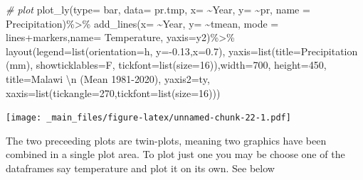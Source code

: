 \documentclass[
]{book}
\newenvironment{Shaded}{\begin{snugshade}}{\end{snugshade}}
\newcommand{\AttributeTok}[1]{\textcolor[rgb]{0.77,0.63,0.00}{#1}}
\newcommand{\CommentTok}[1]{\textcolor[rgb]{0.56,0.35,0.01}{\textit{#1}}}
\newcommand{\DecValTok}[1]{\textcolor[rgb]{0.00,0.00,0.81}{#1}}
\newcommand{\FloatTok}[1]{\textcolor[rgb]{0.00,0.00,0.81}{#1}}
\newcommand{\FunctionTok}[1]{\textcolor[rgb]{0.00,0.00,0.00}{#1}}
\newcommand{\NormalTok}[1]{#1}
\newcommand{\SpecialCharTok}[1]{\textcolor[rgb]{0.00,0.00,0.00}{#1}}
\newcommand{\StringTok}[1]{\textcolor[rgb]{0.31,0.60,0.02}{#1}}
\begin{document}
\begin{Shaded}
\begin{Highlighting}[]
\CommentTok{\# plot }
\FunctionTok{plot\_ly}\NormalTok{(}\AttributeTok{type=} \StringTok{\textquotesingle{}bar\textquotesingle{}}\NormalTok{, }\AttributeTok{data=}\NormalTok{ pr.tmp, }\AttributeTok{x=} \SpecialCharTok{\textasciitilde{}}\NormalTok{Year, }\AttributeTok{y=} \SpecialCharTok{\textasciitilde{}}\NormalTok{pr, }\AttributeTok{name =} \StringTok{\textquotesingle{}Precipitation\textquotesingle{}}\NormalTok{)}\SpecialCharTok{\%\textgreater{}\%}
 \FunctionTok{add\_lines}\NormalTok{(}\AttributeTok{x=} \SpecialCharTok{\textasciitilde{}}\NormalTok{Year, }\AttributeTok{y=} \SpecialCharTok{\textasciitilde{}}\NormalTok{tmean, }\AttributeTok{mode =} \StringTok{\textquotesingle{}lines+markers\textquotesingle{}}\NormalTok{,}\AttributeTok{name=} \StringTok{\textquotesingle{}Temperature\textquotesingle{}}\NormalTok{,}
           \AttributeTok{yaxis=}\StringTok{\textquotesingle{}y2\textquotesingle{}}\NormalTok{)}\SpecialCharTok{\%\textgreater{}\%}
    \FunctionTok{layout}\NormalTok{(}\AttributeTok{legend=}\FunctionTok{list}\NormalTok{(}\AttributeTok{orientation=}\StringTok{\textquotesingle{}h\textquotesingle{}}\NormalTok{, }\AttributeTok{y=}\SpecialCharTok{{-}}\FloatTok{0.13}\NormalTok{,}\AttributeTok{x=}\FloatTok{0.7}\NormalTok{), }
                   \AttributeTok{yaxis=}\FunctionTok{list}\NormalTok{(}\AttributeTok{title=}\StringTok{\textquotesingle{}Precipitation (mm)\textquotesingle{}}\NormalTok{,}
                              \AttributeTok{showticklables=}\NormalTok{F, }\AttributeTok{tickfont=}\FunctionTok{list}\NormalTok{(}\AttributeTok{size=}\DecValTok{16}\NormalTok{)),}\AttributeTok{width=}\DecValTok{700}\NormalTok{, }
           \AttributeTok{height=}\DecValTok{450}\NormalTok{, }\AttributeTok{title=}\StringTok{\textquotesingle{}Malawi }\SpecialCharTok{\textbackslash{}n}\StringTok{ (Mean 1981{-}2020)\textquotesingle{}}\NormalTok{, }
                   \AttributeTok{yaxis2=}\NormalTok{ty, }\AttributeTok{xaxis=}\FunctionTok{list}\NormalTok{(}\AttributeTok{tickangle=}\DecValTok{270}\NormalTok{,}\AttributeTok{tickfont=}\FunctionTok{list}\NormalTok{(}\AttributeTok{size=}\DecValTok{16}\NormalTok{)))}
\end{Highlighting}
\end{Shaded}

\texttt{[image: \_main\_files/figure-latex/unnamed-chunk-22-1.pdf]}

The two preceeding plots are twin-plots, meaning two graphics have been combined in a single plot area.
To plot just one you may be choose one of the dataframes say temperature and plot it on its own. See below
\end{document}
